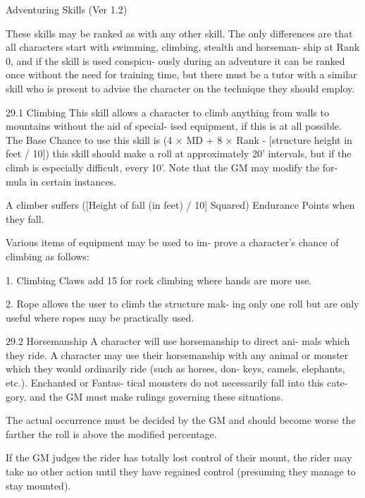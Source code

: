 \begin{Chapter}{Adventuring Skills (Ver 1.2)}

These skills may be ranked as with any other skill. 
The  only  differences  are  that  all  characters  start 
with  swimming,  climbing,  stealth  and  horseman-
ship  at  Rank  0,  and  if  the  skill  is  used  conspicu-
ously  during  an  adventure  it  can  be  ranked  once 
without  the  need  for  training  time,  but  there  must 
be  a  tutor  with  a  similar  skill  who  is  present  to 
advise  the  character  on  the  technique  they  should 
employ. 

29.1 Climbing 
This  skill  allows  a  character  to  climb  anything 
from walls to mountains without the aid of special-
ised  equipment, if  this is  at all  possible.  The  Base 
Chance  to  use  this  skill  is  (4  ×  MD  +  8  ×  Rank  - 
[structure height in feet / 10])%
this  skill  should  make  a  roll  at  approximately  20’ 
intervals,  but  if  the  climb  is  especially  difficult, 
every  10’.  Note  that  the  GM  may  modify  the  for-
mula in certain instances. 

A  climber  suffers  ([Height  of  fall  (in  feet)  /  10] 
Squared) Endurance Points when they fall. 

Various  items  of  equipment  may  be  used  to  im-
prove a character’s chance of climbing as follows: 

1. Climbing Claws add 15%
for rock climbing where hands are more use. 

2. Rope allows the user to climb the structure mak-
ing  only  one  roll  but  are  only  useful  where  ropes 
may be practically used. 

29.2 Horsemanship 
A  character  will  use  horsemanship  to  direct  ani-
mals  which  they  ride.  A  character  may  use  their 
horsemanship  with  any  animal  or  monster  which 
they  would  ordinarily  ride  (such  as  horses,  don-
keys, camels, elephants, etc.). Enchanted or Fantas-
tical monsters do not necessarily fall into this cate-
gory,  and  the  GM  must  make  rulings  governing 
these situations. 

The actual occurrence must be decided by the GM 
and  should  become  worse  the  farther  the  roll  is 
above the modified percentage. 

If  the  GM  judges  the  rider  has  totally  lost  control 
of  their  mount,  the  rider  may  take  no  other  action 
until  they  have  regained  control  (presuming  they 
manage to stay mounted). 


\end{Chapter}
